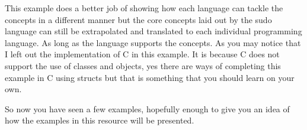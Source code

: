 This example does a better job of showing how each language can tackle the concepts in a different manner but the core concepts
laid out by the sudo language can still be extrapolated and translated to each individual programming language. As long as the
language supports the concepts. As you may notice that I left out the implementation of C in this example. It is because C 
does not support the use of classes and objects, yes there are ways of completing this example in C using structs but that
is something that you should learn on your own.
\par

So now you have seen a few examples, hopefully enough to give you an idea of how the examples in this resource will be presented.
